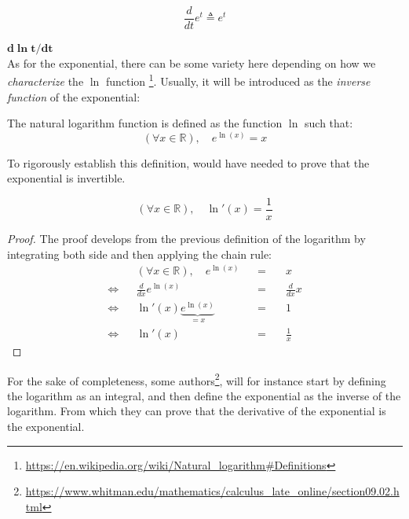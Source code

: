 \documentclass[solutions.tex]{subfiles}
\renewcommand{\bm}[1]{\pmb{#1}}
\begin{document}
\[ \boxed{\frac{d}{dt}e^t \triangleq e^t} \]

\hr
$\bm{d\ln t/dt}$\,\\
As for the exponential, there can be some variety here depending
on how we \textit{characterize} the $\ln$ function
\footnote{\url{https://en.wikipedia.org/wiki/Natural\_logarithm\#Definitions}}.
Usually, it will be introduced as the \textit{inverse function} of
the exponential:
\begin{definition}
The natural logarithm function is defined as the function $\ln$ such that:
\[
	(\forall x\in\mathbb{R}),\quad \boxed{e^{\ln(x)} = x}
\]
\end{definition}
\begin{remark} To rigorously establish this definition, would have
needed to prove that the exponential is invertible.
\end{remark}

\begin{theorem}
\[
	(\forall x\in\mathbb{R}),\quad \boxed{\ln'(x) = \frac1x}
\]
\end{theorem}
\begin{proof}
The proof develops from the previous definition of the logarithm
by integrating both side and then applying the chain rule:
\begin{equation*} \begin{aligned}
	~ && (\forall x\in\mathbb{R}),\quad e^{\ln(x)} &&=\quad& x \\
	\Leftrightarrow && \frac{d}{dx}e^{\ln(x)} &&=\quad& \frac{d}{dx}x \\
	\Leftrightarrow && \ln'(x)\underbrace{e^{\ln(x)}}_{=x} &&=\quad& 1 \\
	\Leftrightarrow && \ln'(x) &&=\quad& \boxed{\frac1x}
\end{aligned} \end{equation*}
\end{proof}

\begin{remark} For the sake of completeness, some authors\footnote{
\url{https://www.whitman.edu/mathematics/calculus\_late\_online/section09.02.html}},
will for instance start by defining the logarithm as an integral,
and then define the exponential as the inverse of the logarithm. From which
they can prove that the derivative of the exponential is the exponential.
\end{remark}
\end{document}
